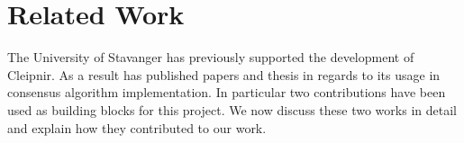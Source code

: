 \chapter{Related Work}
\label{chapter:RW}

The University of Stavanger has previously supported the development of Cleipnir. As a result has published papers and thesis in regards to its usage in consensus algorithm implementation. In particular two contributions have been used as building blocks for this project. We now discuss these two works in detail and explain how they contributed to our work.  

